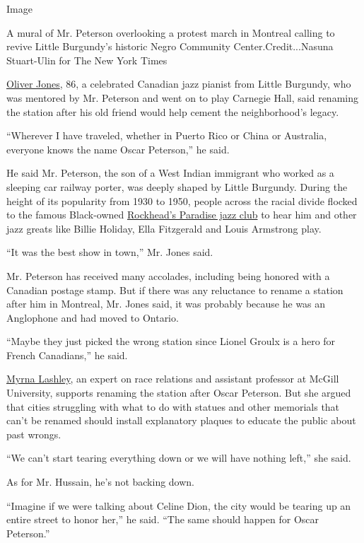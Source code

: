 Image

A mural of Mr. Peterson overlooking a protest march in Montreal calling
to revive Little Burgundy's historic Negro Community
Center.Credit...Nasuna Stuart-Ulin for The New York Times

\href{https://www.youtube.com/watch?v=JB2gqbO8_i0}{Oliver Jones}, 86, a
celebrated Canadian jazz pianist from Little Burgundy, who was mentored
by Mr. Peterson and went on to play Carnegie Hall, said renaming the
station after his old friend would help cement the neighborhood's
legacy.

``Wherever I have traveled, whether in Puerto Rico or China or
Australia, everyone knows the name Oscar Peterson,'' he said.

He said Mr. Peterson, the son of a West Indian immigrant who worked as a
sleeping car railway porter, was deeply shaped by Little Burgundy.
During the height of its popularity from 1930 to 1950, people across the
racial divide flocked to the famous Black-owned
\href{https://www.thecanadianencyclopedia.ca/en/article/rockheads-paradise}{Rockhead's
Paradise jazz club} to hear him and other jazz greats like Billie
Holiday, Ella Fitzgerald and Louis Armstrong play.

``It was the best show in town,'' Mr. Jones said.

Mr. Peterson has received many accolades, including being honored with a
Canadian postage stamp. But if there was any reluctance to rename a
station after him in Montreal, Mr. Jones said, it was probably because
he was an Anglophone and had moved to Ontario.

``Maybe they just picked the wrong station since Lionel Groulx is a hero
for French Canadians,'' he said.

\href{https://www.mcgill.ca/tcpsych/faculty/myrnalashley}{Myrna
Lashley}, an expert on race relations and assistant professor at McGill
University, supports renaming the station after Oscar Peterson. But she
argued that cities struggling with what to do with statues and other
memorials that can't be renamed should install explanatory plaques to
educate the public about past wrongs.

``We can't start tearing everything down or we will have nothing left,''
she said.

As for Mr. Hussain, he's not backing down.

``Imagine if we were talking about Celine Dion, the city would be
tearing up an entire street to honor her,'' he said. ``The same should
happen for Oscar Peterson.''


